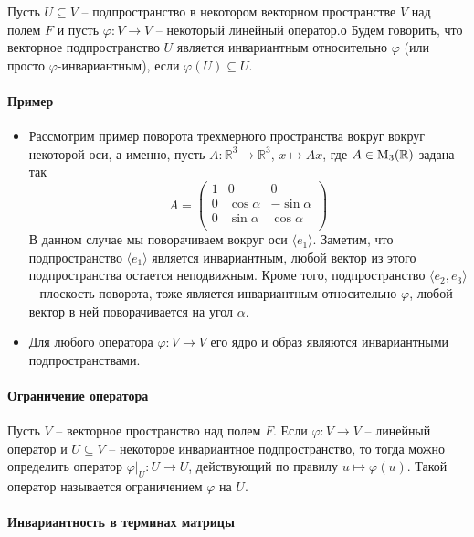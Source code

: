 Пусть $U\subseteq V$ -- подпространство в некотором векторном пространстве $V$ над полем $F$ и пусть $\varphi\colon V\to V$ -- некоторый линейный оператор.о Будем говорить, что векторное подпространство $U$ является инвариантным относительно $\varphi$ (или просто $\varphi$-инвариантным), если $\varphi(U)\subseteq U$.


\paragraph{Пример}

\begin{itemize}
\item Рассмотрим пример поворота трехмерного пространства вокруг вокруг некоторой оси, а именно, пусть $A\colon \mathbb R^3 \to \mathbb R^3$, $x\mapsto Ax$, где $A\in \operatorname{M}_{3}(\mathbb R)$ задана так
\[
A = 
\begin{pmatrix}
{1}&{0}&{0}\\
{0}&{\cos \alpha}&{-\sin \alpha}\\
{0}&{\sin \alpha}&{\cos \alpha}\\
\end{pmatrix}
\]
В данном случае мы поворачиваем вокруг оси $\langle e_1 \rangle$.
Заметим, что подпространство $\langle e_1\rangle$ является инвариантным, любой вектор из этого подпространства остается неподвижным.
Кроме того, подпространство $\langle e_2, e_3\rangle$ -- плоскость поворота, тоже является инвариантным относительно $\varphi$, любой вектор в ней поворачивается на угол $\alpha$.

\item Для любого оператора $\varphi \colon V\to V$ его ядро и образ являются инвариантными подпространствами.
\end{itemize}

\paragraph{Ограничение оператора} 

\begin{definition}
Пусть $V$ -- векторное пространство над полем $F$.
Если $\varphi \colon V\to V$ -- линейный оператор и $U\subseteq V$ -- некоторое инвариантное подпространство, то тогда можно определить оператор $\varphi|_U\colon U\to U$, действующий по правилу $u\mapsto \varphi(u)$.
Такой оператор называется ограничением $\varphi$ на $U$.
\end{definition}

\paragraph{Инвариантность в терминах матрицы}


